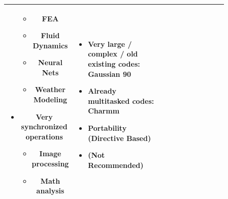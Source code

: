 \documentclass[12pt, a4paper]{book}
\begin{document}
\begin{longtable}{|c|p{0.43\linewidth}|p{0.43\linewidth}|}
\begin{itemize}
\begin{itemize}
                  \item FEA
                  \item Fluid Dynamics
                  \item Neural Nets
                  \item Weather Modeling
              \end{itemize}
                        \item Very synchronized operations
                              \begin{itemize}
                  \item Image processing
                  \item Math analysis
              \end{itemize}
                    \end{itemize}                                                               & \begin{itemize}
                                                                                                      \item Very large / complex / old existing codes: Gaussian 90
                                                                                                      \item Already multitasked codes: Charmm
                                                                                                      \item Portability (Directive Based)
                                                                                                      \item (Not Recommended)
                                                                                                  \end{itemize}                                                                \\
    \hline
\end{longtable}
\end{document}
